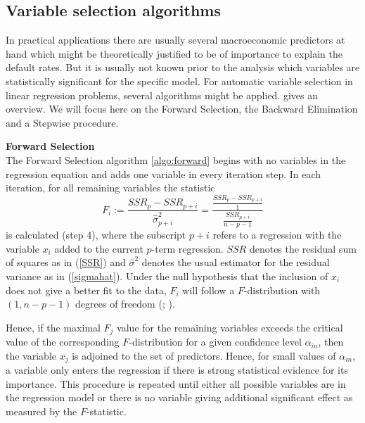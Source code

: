 \documentclass[a4paper, 11pt]{scrreprt}
\begin{document}
\subsection{Variable selection algorithms}\label{par:varselection}

In practical applications there are usually several macroeconomic predictors at hand which might be theoretically justified to be of importance to explain the default rates. 
But it is usually not known prior to the analysis which variables are statistically significant for the specific model.
For automatic variable selection in linear regression problems, several algorithms might be applied. \textcite[chapter 3.2]{hocking1976biometrics} gives an overview.
We will focus here on the Forward Selection, the Backward Elimination and a Stepwise procedure.

\bigskip 
\textbf{Forward Selection} \\
The Forward Selection algorithm \ref{algo:forward} begins with no variables in the regression equation and adds one variable in every iteration step. 
In each iteration, for all remaining variables the statistic
\begin{equation}
F_i := 	 \frac{SSR_p - SSR_{p+i}}{\hat{\sigma}_{p+i}^2} =
\frac{ \frac{SSR_p - SSR_{p+i}}{1} }{ \frac{SSR_{p+i}}{n-p-1}}
\end{equation}
is calculated (step 4), where the subscript $p+i$ refers to a regression with the variable $x_i$ added to the current $p$-term regression. $SSR$ denotes the residual sum of squares as in (\ref{SSR}) and $\hat{\sigma}^2$ denotes the usual estimator for the residual variance as in (\ref{sigmahat}).
Under the null hypothesis that the inclusion of $x_i$ does not give a better fit to the data, $F_i$ will follow a $F$-distribution with $(1, n-p-1)$ degrees of freedom
(\textcite[chapter 4.6]{hocking1976biometrics}; \textcite[chapter 9.7]{degroot2014probability}).

Hence, if the maximal $F_j$ value for the remaining variables exceeds the critical value of the corresponding $F$-distribution for a given confidence level $\alpha_{in}$, then the variable $x_j$ is adjoined to the set of predictors. Hence, for small values of $\alpha_{in}$, a variable only enters the regression if there is strong statistical evidence for its importance.
This procedure is repeated until either all possible variables are in the regression model or there is no variable giving additional significant effect as measured by the $F$-statistic.
\end{document}

